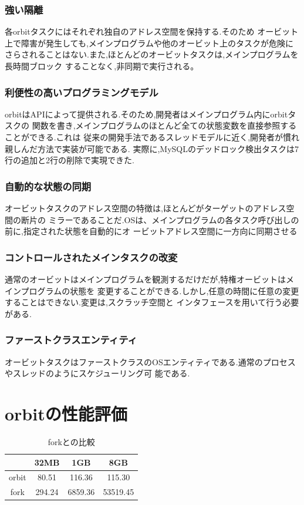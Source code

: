 \documentclass[submit,techreq,noauthor]{eco}	%
\begin{document}
\subsubsection*{強い隔離}
各orbitタスクにはそれぞれ独自のアドレス空間を保持する.そのため
オービット上で障害が発生しても,メインプログラムや他のオービット上のタスクが危険に
さらされることはない.また,ほとんどのオービットタスクは,メインプログラムを長時間ブロック
することなく,非同期で実行される。

\subsubsection*{利便性の高いプログラミングモデル}
orbitはAPIによって提供される.そのため,開発者はメインプログラム内にorbitタスクの
関数を書き,メインプログラムのほとんど全ての状態変数を直接参照することができる.これは
従来の開発手法であるスレッドモデルに近く,開発者が慣れ親しんだ方法で実装が可能である.
実際に,MySQLのデッドロック検出タスクは7行の追加と2行の削除で実現できた.

\subsubsection*{自動的な状態の同期}
オービットタスクのアドレス空間の特徴は,ほとんどがターゲットのアドレス空間の断片の
ミラーであることだ.OSは、メインプログラムの各タスク呼び出しの前に,指定された状態を自動的にオ
ービットアドレス空間に一方向に同期させる

\subsubsection*{コントロールされたメインタスクの改変}
通常のオービットはメインプログラムを観測するだけだが,特権オービットはメインプログラムの状態を
変更することができる.しかし,任意の時間に任意の変更することはできない.変更は,スクラッチ空間と
インタフェースを用いて行う必要がある.

\subsubsection*{ファーストクラスエンティティ}
オービットタスクはファーストクラスのOSエンティティである.通常のプロセスやスレッドのようにスケジューリング可
能である.

\section{orbitの性能評価}

\begin{table}[H]
  \centering
  \caption{forkとの比較}
  \begin{tabular}{cccc}
  \hline
        & 32MB   & 1GB     & 8GB      \\ \hline
  orbit & 80.51  & 116.36  & 115.30   \\
  fork  & 294.24 & 6859.36 & 53519.45 \\ \hline
  \end{tabular}
  \end{table}
\end{document}
